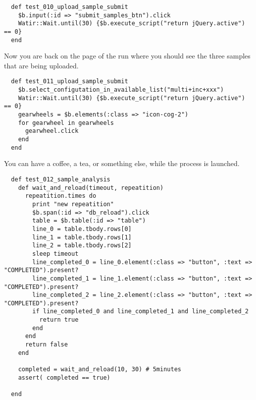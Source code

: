 \begin{verbatim}
  def test_010_upload_sample_submit
    $b.input(:id => "submit_samples_btn").click
    Watir::Wait.until(30) {$b.execute_script("return jQuery.active") == 0}
  end

\end{verbatim}

Now you are back on the page of the run where you should see the three samples
that are being uploaded.

\begin{verbatim}
  def test_011_upload_sample_submit
    $b.select_configutation_in_available_list("multi+inc+xxx")
    Watir::Wait.until(30) {$b.execute_script("return jQuery.active") == 0}
    gearwheels = $b.elements(:class => "icon-cog-2")
    for gearwheel in gearwheels
      gearwheel.click
    end
  end

\end{verbatim}

You can have a coffee, a tea, or something else, while the process is
launched.

\begin{verbatim}
  def test_012_sample_analysis
    def wait_and_reload(timeout, repeatition)
      repeatition.times do
        print "new repeatition"
        $b.span(:id => "db_reload").click
        table = $b.table(:id => "table")
        line_0 = table.tbody.rows[0]
        line_1 = table.tbody.rows[1]
        line_2 = table.tbody.rows[2]
        sleep timeout
        line_completed_0 = line_0.element(:class => "button", :text => "COMPLETED").present?
        line_completed_1 = line_1.element(:class => "button", :text => "COMPLETED").present?
        line_completed_2 = line_2.element(:class => "button", :text => "COMPLETED").present?
        if line_completed_0 and line_completed_1 and line_completed_2
          return true
        end
      end
      return false
    end

    completed = wait_and_reload(10, 30) # 5minutes
    assert( completed == true)

  end

\end{verbatim}

